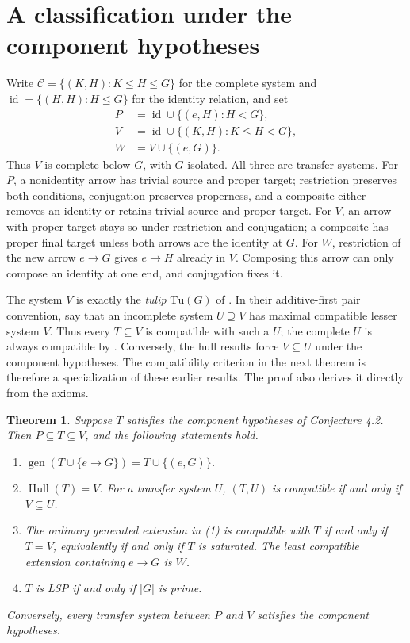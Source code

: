 \documentclass[11pt]{article}
\newtheorem{theorem}{Theorem}
\newcommand{\Hull}{\operatorname{Hull}}
\newcommand{\gen}{\operatorname{gen}}
\newcommand{\id}{\operatorname{id}}
\begin{document}
\section{A classification under the component hypotheses}
Write $\mathcal C=\{(K,H):K\leq H\leq G\}$ for the complete system and
$\id=\{(H,H):H\leq G\}$ for the identity relation, and set
\begin{align*}
 P&=\id\cup\{(e,H):H<G\},\\
 V&=\id\cup\{(K,H):K\leq H<G\},\\
 W&=V\cup\{(e,G)\}.
\end{align*}
Thus $V$ is complete below $G$, with $G$ isolated. All three are transfer
systems. For $P$, a nonidentity arrow has trivial source and proper target;
restriction preserves both conditions, conjugation preserves properness,
and a composite either removes an identity or retains trivial source and
proper target. For $V$, an arrow with proper target stays so under
restriction and conjugation; a composite has proper final target unless
both arrows are the identity at $G$. For $W$, restriction of the new arrow
$e\to G$ gives $e\to H$ already in $V$. Composing this arrow can only
compose an identity at one end, and conjugation fixes it.

The system $V$ is exactly the \emph{tulip} $\mathrm{Tu}(G)$ of
\cite[Definition 3.15]{D}. In their additive-first pair convention,
\cite[Propositions 2.21 and 3.17]{D} say that an incomplete system
$U\supseteq V$ has maximal compatible lesser system $V$.
Thus every $T\subseteq V$ is compatible with such a $U$; the complete
$U$ is always compatible by \cite[Proposition 2.17]{D}.
Conversely, the hull results \cite[Propositions 2.14 and 3.5]{M} force
$V\subseteq U$ under the component hypotheses. The compatibility criterion
in the next theorem is therefore a specialization of these earlier results.
The proof also derives it directly from the axioms.

\begin{theorem}\label{thm:classification}
Suppose $T$ satisfies the component hypotheses of Conjecture 4.2.
Then $P\subseteq T\subseteq V$, and the following statements hold.
\begin{enumerate}
\item $\gen(T\cup\{e\to G\})=T\cup\{(e,G)\}$.
\item $\Hull(T)=V$. For a transfer system $U$, $(T,U)$ is compatible
if and only if $V\subseteq U$.
\item The ordinary generated extension in (1) is compatible with $T$
if and only if $T=V$, equivalently if and only if $T$ is saturated.
The least compatible extension containing $e\to G$ is $W$.
\item $T$ is LSP if and only if $|G|$ is prime.
\end{enumerate}
Conversely, every transfer system between $P$ and $V$ satisfies the
component hypotheses.
\end{theorem}
\end{document}
